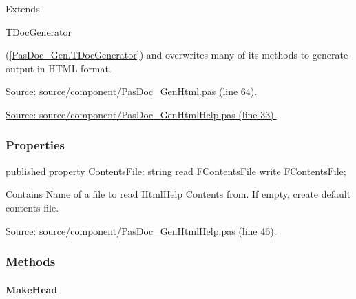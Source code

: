 \documentclass{report}
\newif\ifpdf
\begin{document}
 Extends \begin{ttfamily}TDocGenerator\end{ttfamily}(\ref{PasDoc_Gen.TDocGenerator}) and overwrites many of its methods to generate output in HTML format.\par
\href{https://github.com/pasdoc/pasdoc/blob/master/source/component/PasDoc_GenHtml.pas#L64}{Source: source/component/PasDoc{\_}GenHtml.pas (line 64).}\par
\href{https://github.com/pasdoc/pasdoc/blob/master/source/component/PasDoc_GenHtmlHelp.pas#L33}{Source: source/component/PasDoc{\_}GenHtmlHelp.pas (line 33).}\subsubsection*{\large{\textbf{Properties}}\normalsize\hspace{1ex}\hfill}
\begin{list}{}{
\setlength{\itemindent}{0cm}
\setlength{\listparindent}{0cm}
\setlength{\leftmargin}{\evensidemargin}
\addtolength{\leftmargin}{\tmplength}
\settowidth{\labelsep}{X}
\addtolength{\leftmargin}{\labelsep}
\setlength{\labelwidth}{\tmplength}
}
\label{PasDoc_GenHtmlHelp.THTMLHelpDocGenerator-ContentsFile}
\item[\textbf{ContentsFile}\hfill]
\ifpdf
\begin{flushleft}
\fi
\begin{ttfamily}
published property ContentsFile: string read FContentsFile write FContentsFile;\end{ttfamily}

\ifpdf
\end{flushleft}
\fi


\par Contains Name of a file to read HtmlHelp Contents from. If empty, create default contents file.\par
\href{https://github.com/pasdoc/pasdoc/blob/master/source/component/PasDoc_GenHtmlHelp.pas#L46}{Source: source/component/PasDoc{\_}GenHtmlHelp.pas (line 46).}\end{list}
\subsubsection*{\large{\textbf{Methods}}\normalsize\hspace{1ex}\hfill}
\paragraph*{MakeHead}\hspace*{\fill}
\end{document}

